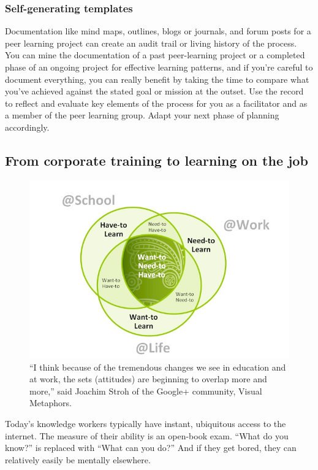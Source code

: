 \subsubsection{Self-generating templates}

Documentation like mind maps, outlines, blogs or journals, and forum
posts for a peer learning project can create an audit trail or living
history of the process. You can mine the documentation of a past
peer-learning project or a completed phase of an ongoing project for
effective learning patterns, and if you're careful to document
everything, you can really benefit by taking the time to compare what
you've achieved against the stated goal or mission at the outset. Use
the record to reflect and evaluate key elements of the process for you
as a facilitator and as a member of the peer learning group. Adapt your
next phase of planning accordingly.

\subsection{From corporate training to learning on the job}

\begin{figure}
\begin{center}
\includegraphics[width=.75\textwidth]{../pictures/learn.jpg}
\caption*{``I think because of the
tremendous changes we see in education and at work, the sets
(attitudes) are beginning to overlap more and more,'' said Joachim
Stroh of the Google+ community, Visual Metaphors.}
\end{center}
\end{figure}

Today's knowledge workers typically have instant, ubiquitous access to
the internet. The measure of their ability is an open-book exam. ``What
do you know?'' is replaced with ``What can you do?'' And if they get
bored, they can relatively easily be mentally elsewhere.

